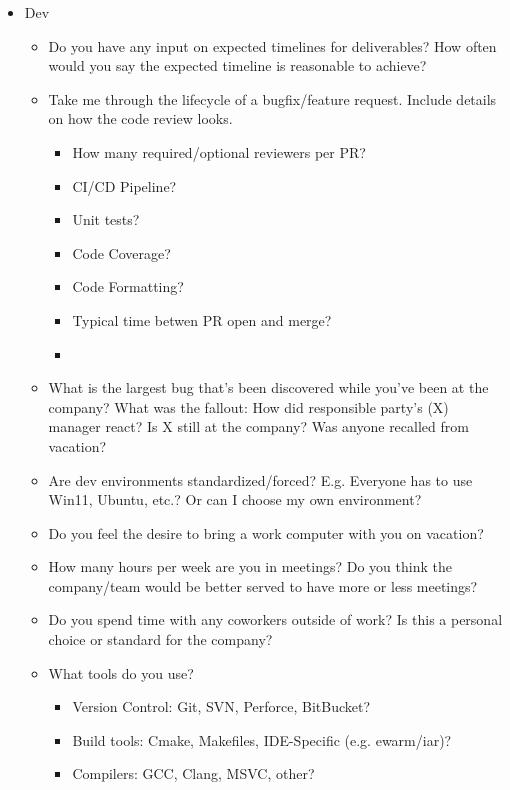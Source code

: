 \documentclass{article}
\begin{document}
\begin{itemize}
\begin{itemize}
	      \end{itemize}
	\item Dev
	      \begin{itemize}
		      \item Do you have any input on expected timelines for deliverables? How often would you say the expected timeline is reasonable to achieve?
		      \item Take me through the lifecycle of a bugfix/feature request. Include details on how the code review looks.
		            \begin{itemize}
			            \item How many required/optional reviewers per PR?
			            \item CI/CD Pipeline?
			            \item Unit tests?
			            \item Code Coverage?
			            \item Code Formatting?
			            \item Typical time betwen PR open and merge?
			            \item
		            \end{itemize}
		      \item What is the largest bug that's been discovered while you've been at the company? What was the fallout: How did responsible party's (X) manager react? Is X still at the company? Was anyone recalled from vacation?
		      \item Are dev environments standardized/forced? E.g. Everyone has to use Win11, Ubuntu, etc.? Or can I choose my own environment?
		      \item Do you feel the desire to bring a work computer with you on vacation?
		      \item How many hours per week are you in meetings? Do you think the company/team would be better served to have more or less meetings?
		      \item Do you spend time with any coworkers outside of work? Is this a personal choice or standard for the company?
		      \item What tools do you use?
		            \begin{itemize}
			            \item Version Control: Git, SVN, Perforce, BitBucket?
			            \item Build tools: Cmake, Makefiles, IDE-Specific (e.g. ewarm/iar)?
			            \item Compilers: GCC, Clang, MSVC, other?

\end{itemize}
\end{itemize}
\end{itemize}
\end{document}
